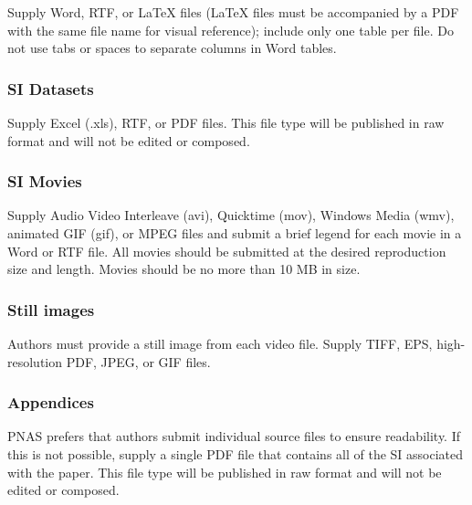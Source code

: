 \documentclass[9pt,twocolumn,twoside,]{pnas-new}
\begin{document}
Supply Word, RTF, or LaTeX files (LaTeX files must be accompanied by a
PDF with the same file name for visual reference); include only one
table per file. Do not use tabs or spaces to separate columns in Word
tables.

\subsubsection*{SI Datasets}\label{si-datasets}

Supply Excel (.xls), RTF, or PDF files. This file type will be published
in raw format and will not be edited or composed.

\subsubsection*{SI Movies}\label{si-movies}

Supply Audio Video Interleave (avi), Quicktime (mov), Windows Media
(wmv), animated GIF (gif), or MPEG files and submit a brief legend for
each movie in a Word or RTF file. All movies should be submitted at the
desired reproduction size and length. Movies should be no more than 10
MB in size.

\subsubsection*{Still images}\label{still-images}

Authors must provide a still image from each video file. Supply TIFF,
EPS, high-resolution PDF, JPEG, or GIF files.

\subsubsection*{Appendices}\label{appendices}

PNAS prefers that authors submit individual source files to ensure
readability. If this is not possible, supply a single PDF file that
contains all of the SI associated with the paper. This file type will be
published in raw format and will not be edited or composed.

\showmatmethods
\showacknow
\pnasbreak
\end{document}
